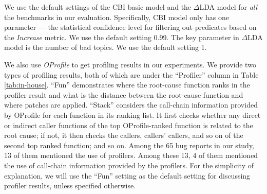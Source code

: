 We use the default settings of the CBI basic model and the 
$\Delta$LDA model for \textit{all} the benchmarks in our evaluation.
Specifically, CBI model only has one parameter --- the statistical
confidence level for filtering out predicates based on the \textit{Increase}
metric. We use the default setting 0.99. The key parameter
in $\Delta$LDA model is the number of bad topics. We use the default setting
1.

We also use \textit{OProfile} \cite{oprofile} to get profiling results in our 
experiments.
We provide two types of profiling results, both of which are under the
``Profiler'' column in Table \ref{tab:in-house}.
``Fun'' demonstrates where the root-cause function ranks in the profiler 
result and what is the distance between 
the root-cause function and where patches are applied. 
``Stack'' considers the call-chain information provided by OProfile for each function
in its ranking list. It first checks whether any direct or indirect caller functions
of the top OProfile-ranked function is related to the root
cause; if not, it then checks the callers, callers' callers, and so on
of the second top ranked function;
and so on.
Among the 65 bug reports in our study, 13 of them mentioned the use of 
profilers. Among these 13, 4 of them mentioned the use of call-chain information
provided by the profilers.
For the simplicity of explanation, we will use the ``Fun'' setting as the
default setting for discussing profiler results,
unless specified otherwise.

